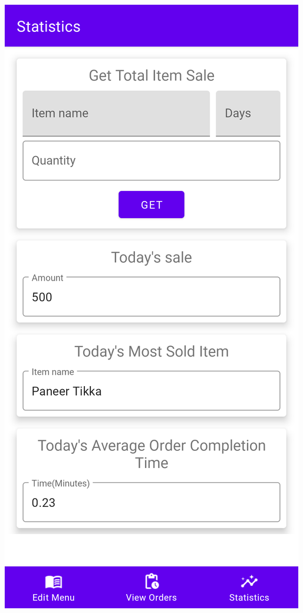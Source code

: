 \documentclass{article}
\begin{document}
\begin{center}
\includegraphics[scale=0.15]{statistics}
\end{center}

\newpage
\end{document}
